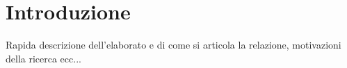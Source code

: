 
\chapter{Introduzione}
Rapida descrizione dell'elaborato e di come si articola la relazione, motivazioni della ricerca ecc...